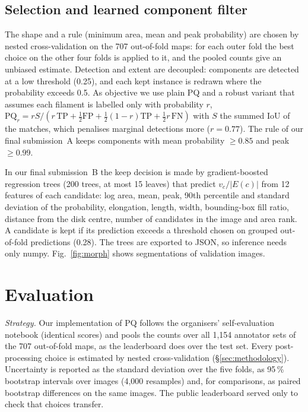 \documentclass[sigconf]{acmart}
\begin{document}
\subsection{Selection and learned component filter}
The shape and a rule (minimum area, mean and peak probability) are chosen by nested cross-validation on the 707 out-of-fold maps: for each outer fold the best choice on the other four folds is applied to it, and the pooled counts give an unbiased estimate. Detection and extent are decoupled: components are detected at a low threshold (0.25), and each kept instance is redrawn where the probability exceeds 0.5. As objective we use plain PQ and a robust variant that assumes each filament is labelled only with probability $r$, $\mathrm{PQ}_r=rS/(r\,\mathrm{TP}+\tfrac12\mathrm{FP}+\tfrac12(1-r)\mathrm{TP}+\tfrac12 r\,\mathrm{FN})$ with $S$ the summed IoU of the matches, which penalises marginal detections more ($r=0.77$). The rule of our final submission~A keeps components with mean probability $\ge0.85$ and peak $\ge0.99$.

In our final submission~B the keep decision is made by gradient-boosted regression trees (200 trees, at most 15 leaves) that predict $v_c/|E(c)|$ from 12 features of each candidate: log area, mean, peak, 90th percentile and standard deviation of the probability, elongation, length, width, bounding-box fill ratio, distance from the disk centre, number of candidates in the image and area rank. A candidate is kept if its prediction exceeds a threshold chosen on grouped out-of-fold predictions (0.28). The trees are exported to JSON, so inference needs only numpy. Fig.~\ref{fig:morph} shows segmentations of validation images.

\section{Evaluation}\label{sec:evaluation}
\emph{Strategy.} Our implementation of PQ follows the organisers' self-evaluation notebook (identical scores) and pools the counts over all 1,154 annotator sets of the 707 out-of-fold maps, as the leaderboard does over the test set. Every post-processing choice is estimated by nested cross-validation (\S\ref{sec:methodology}). Uncertainty is reported as the standard deviation over the five folds, as 95\,\% bootstrap intervals over images (4,000 resamples) and, for comparisons, as paired bootstrap differences on the same images. The public leaderboard served only to check that choices transfer.
\end{document}
